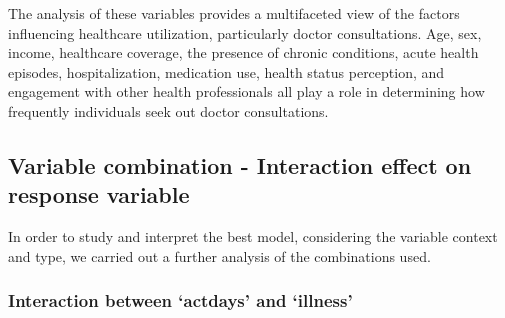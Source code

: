 \documentclass[
]{article}
\begin{document}
The analysis of these variables provides a multifaceted view of the
factors influencing healthcare utilization, particularly doctor
consultations. Age, sex, income, healthcare coverage, the presence of
chronic conditions, acute health episodes, hospitalization, medication
use, health status perception, and engagement with other health
professionals all play a role in determining how frequently individuals
seek out doctor consultations.

\subsection{Variable combination - Interaction effect on response
variable}\label{variable-combination---interaction-effect-on-response-variable}

In order to study and interpret the best model, considering the variable
context and type, we carried out a further analysis of the combinations
used.

\subsubsection{Interaction between `actdays' and
`illness'}\label{interaction-between-actdays-and-illness}
\end{document}

